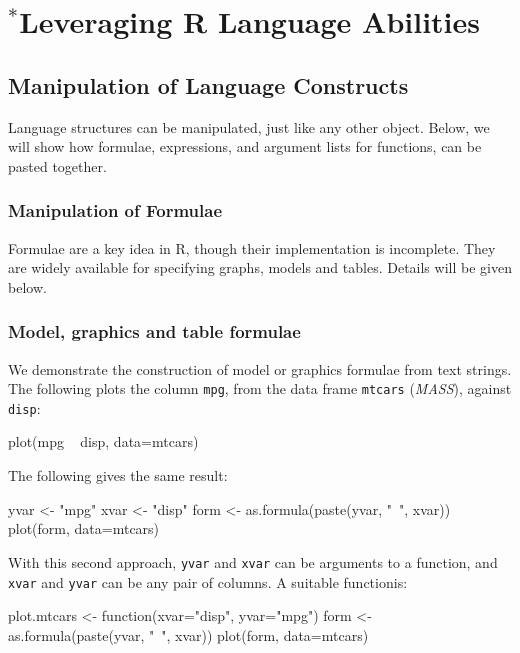 \documentclass{tufte-book}\usepackage[]{graphicx}\usepackage[]{color}
\newcommand{\txtt}[1]{\texttt{#1}}
\begin{document}
\cleartooddpage

\chapter{$^*$Leveraging R Language Abilities }





\section{Manipulation of Language Constructs}

Language structures can be manipulated, just like any other object.
Below, we will show how formulae, expressions, and argument lists
for functions, can be pasted together.

\subsection{Manipulation of Formulae}

Formulae are a key idea in R, though their implementation is
incomplete. They are widely available for specifying graphs,
models and tables. Details will be given below.

\subsection*{Model, graphics and table formulae}
We demonstrate the construction of model or graphics formulae from
text strings. The following plots the column \txtt{mpg}, from the data
frame \txtt{mtcars} (\textit{MASS}), against \txtt{disp}:
\begin{Schunk}
\begin{Sinput}
plot(mpg ~ disp, data=mtcars)
\end{Sinput}
\end{Schunk}
The following gives the same result:
\begin{Schunk}
\begin{Sinput}
yvar <- "mpg"
xvar <- "disp"
form <- as.formula(paste(yvar, "~", xvar))
plot(form, data=mtcars)
\end{Sinput}
\end{Schunk}
With this second approach, \txtt{yvar} and \txtt{xvar}
can be arguments to a function, and \txtt{xvar} and
\txtt{yvar} can be any pair of columns.  A suitable
functionis:
\begin{Schunk}
\begin{Sinput}
plot.mtcars <- function(xvar="disp", yvar="mpg"){
    form <- as.formula(paste(yvar, "~", xvar))
    plot(form, data=mtcars)
}
\end{Sinput}
\end{Schunk}
\end{document}
